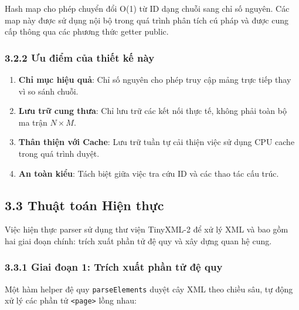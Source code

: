 \documentclass[12pt,a4paper]{article}
\begin{document}
Hash map cho phép chuyển đổi O(1) từ ID dạng chuỗi sang chỉ số nguyên. Các map này được sử dụng nội bộ trong quá trình phân tích cú pháp và được cung cấp thông qua các phương thức getter public.

\subsubsection*{3.2.2 Ưu điểm của thiết kế này}

\begin{enumerate}
    \item \textbf{Chỉ mục hiệu quả}: Chỉ số nguyên cho phép truy cập mảng trực tiếp thay vì so sánh chuỗi.
    \item \textbf{Lưu trữ cung thưa}: Chỉ lưu trữ các kết nối thực tế, không phải toàn bộ ma trận $N \times M$.
    \item \textbf{Thân thiện với Cache}: Lưu trữ tuần tự cải thiện việc sử dụng CPU cache trong quá trình duyệt.
    \item \textbf{An toàn kiểu}: Tách biệt giữa việc tra cứu ID và các thao tác cấu trúc.
\end{enumerate}

\subsection*{3.3 Thuật toán Hiện thực}

Việc hiện thực parser sử dụng thư viện TinyXML-2 để xử lý XML và bao gồm hai giai đoạn chính: trích xuất phần tử đệ quy và xây dựng quan hệ cung.

\subsubsection*{3.3.1 Giai đoạn 1: Trích xuất phần tử đệ quy}

Một hàm helper đệ quy \texttt{parseElements} duyệt cây XML theo chiều sâu, tự động xử lý các phần tử \texttt{<page>} lồng nhau:

\begin{algorithm}[H]
\SetAlgoLined
\caption{Trích xuất phần tử PNML đệ quy}
\end{algorithm}
\end{document}

